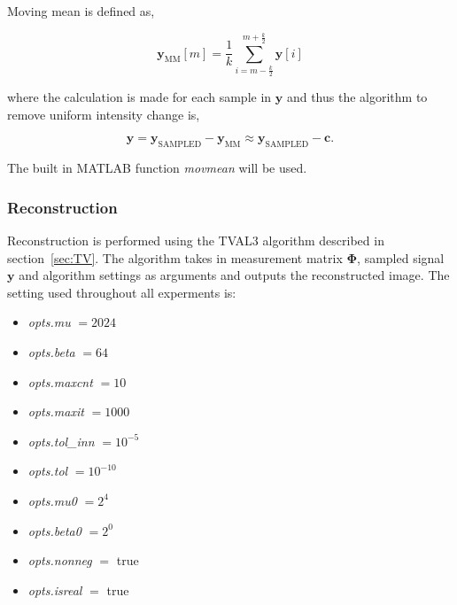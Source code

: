 Moving mean is defined as,

\begin{equation}
\mathbf{y}_{\text{MM}}[m] = \frac{1}{k} \sum_{i = m-\frac{k}{2}}^{m + \frac{k}{2}} \mathbf{y}[i]
\end{equation}   
		 
where the calculation is made for each sample in $\mathbf{y}$ and thus the algorithm to remove uniform intensity change is,

\begin{equation}
\mathbf{y} = \mathbf{y}_{\text{SAMPLED}} - \mathbf{y}_{\text{MM}} \approx \mathbf{y}_{\text{SAMPLED}} -\mathbf{c}.
\end{equation}

The built in MATLAB function \textit{movmean} will be used.
		 
%

\subsubsection{Reconstruction}
Reconstruction is performed using the TVAL3 algorithm described in section~\ref{sec:TV}. The algorithm takes in measurement matrix $\mathbf{\Phi}$, sampled signal $\mathbf{y}$ and algorithm settings as arguments and outputs the reconstructed image. The setting used throughout all experments is:

\begin{itemize}
\item \textit{opts.mu} $= 2024$
\item \textit{opts.beta} $= 64$
\item \textit{opts.maxcnt} $= 10$
\item \textit{opts.maxit} $= 1000$
\item \textit{opts.tol\_inn} $= 10^{-5}$
\item \textit{opts.tol} $= 10^{-10}$ 
\item \textit{opts.mu0} $= 2^4$ 
\item \textit{opts.beta0} $= 2^0$
\item \textit{opts.nonneg} $=$ true 
\item \textit{opts.isreal} $=$ true	
\end{itemize} 

